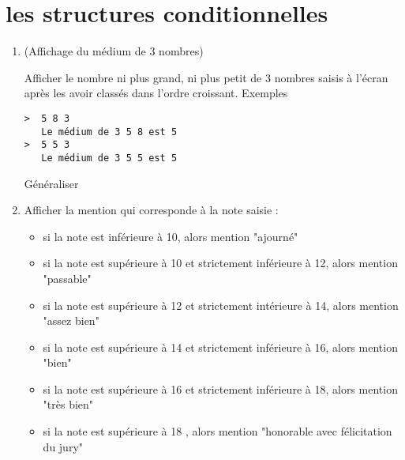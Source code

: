 \documentclass[a4paper]{article}
\begin{document}
\section{les structures conditionnelles}
\begin{enumerate}
%

\item (Affichage du médium de 3 nombres)

Afficher le nombre ni plus grand, ni plus petit de 3 nombres saisis à l'écran après les avoir classés dans l'ordre croissant.
Exemples
\begin{verbatim}
>  5 8 3
   Le médium de 3 5 8 est 5
>  5 5 3
   Le médium de 3 5 5 est 5
\end{verbatim}
Généraliser

\item Afficher la mention qui corresponde à la note saisie :
\begin{itemize}
\item  si la note est inférieure à 10, alors mention "ajourné"
\item  si la note est supérieure à 10 et strictement inférieure à 12, alors mention "passable"
\item  si la note est supérieure à 12 et strictement intérieure à 14, alors mention "assez bien"
\item  si la note est supérieure à 14 et strictement inférieure à 16, alors mention "bien"
\item  si la note est supérieure à 16 et strictement inférieure à 18, alors mention "très bien"
\item  si la note est supérieure à 18 , alors mention "honorable avec félicitation du jury"
\end{itemize}




\end{enumerate}
\end{document}
